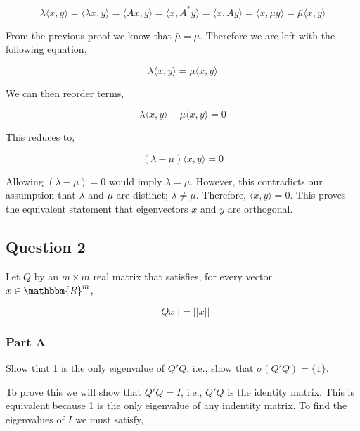 \begin{equation}
  \lambda \langle x,y \rangle
  = \langle \lambda x,y \rangle
  = \langle Ax,y \rangle
  = \langle x,A^{*}y \rangle
  = \langle x,Ay \rangle
  = \langle x,\mu y \rangle
  = \bar{\mu} \langle x,y \rangle
\end{equation}

From the previous proof we know that \(\bar{\mu} = \mu\).
Therefore we are left with the following equation,

\begin{equation}
  \lambda \langle x,y \rangle = \mu \langle x,y \rangle
\end{equation}

We can then reorder terms,

\begin{equation}
  \lambda \langle x,y \rangle - \mu \langle x,y \rangle = 0
\end{equation}

This reduces to,

\begin{equation}
  (\lambda - \mu) \langle x,y \rangle = 0
\end{equation}

Allowing \( (\lambda -\mu) = 0\) would imply \( \lambda = \mu \).
However, this contradicts our assumption that \(\lambda\) and \(\mu\) are distinct; \( \lambda \ne \mu \).
Therefore, \( \langle x,y \rangle = 0 \).
This proves the equivalent statement that eigenvectors \(x\) and \(y\) are orthogonal.


\newpage
\subsection{Question 2}

Let \(Q\) by an \(m \times m\) real matrix that satisfies, for every vector \(x \in \mathbbm{R}^{m}\),

\begin{equation}
  ||Qx|| = ||x||
\end{equation}

\subsubsection{Part A}
\label{sec:q2_partA}
Show that 1 is the only eigenvalue of \(Q'Q\), i.e., show that \(\sigma(Q'Q) = \{1\}\).

To prove this we will show that \(Q'Q = I\), i.e., \(Q'Q\) is the identity matrix.
This is equivalent because 1 is the only eigenvalue of any indentity matrix.
To find the eigenvalues of \(I\) we must satisfy,

